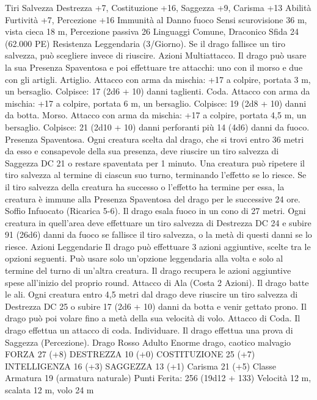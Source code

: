 \begin{multicols}{2}
Tiri Salvezza Destrezza +7, Costituzione +16, Saggezza +9,
Carisma +13
Abilità Furtività +7, Percezione +16
Immunità al Danno fuoco
Sensi scurovisione 36 m, vista cieca 18 m, Percezione passiva 26
Linguaggi Comune, Draconico
Sfida 24 (62.000 PE)
Resistenza Leggendaria (3/Giorno). Se il drago fallisce un tiro
salvezza, può scegliere invece di riuscire.
Azioni
Multiattacco. Il drago può usare la sua Presenza Spaventosa e
poi effettuare tre attacchi: uno con il morso e due con gli artigli.
Artiglio. Attacco con arma da mischia: +17 a colpire, portata 3
m, un bersaglio.
Colpisce: 17 (2d6 + 10) danni taglienti.
Coda. Attacco con arma da mischia: +17 a colpire, portata 6 m,
un bersaglio.
Colpisce: 19 (2d8 + 10) danni da botta.
Morso. Attacco con arma da mischia: +17 a colpire, portata 4,5
m, un bersaglio.
Colpisce: 21 (2d10 + 10) danni perforanti più 14 (4d6) danni da
fuoco.
Presenza Spaventosa. Ogni creatura scelta dal drago, che si trovi
entro 36 metri da esso e consapevole della sua presenza, deve
riuscire un tiro salvezza di Saggezza DC 21 o restare spaventata
per 1 minuto. Una creatura può ripetere il tiro salvezza al termine
di ciascun suo turno, terminando l’effetto se lo riesce. Se il tiro
salvezza della creatura ha successo o l’effetto ha termine per
essa, la creatura è immune alla Presenza Spaventosa del drago
per le successive 24 ore.
Soffio Infuocato (Ricarica 5-6). Il drago esala fuoco in un cono
di 27 metri. Ogni creatura in quell’area deve effettuare un tiro
salvezza di Destrezza DC 24 e subire 91 (26d6) danni da fuoco
se fallisce il tiro salvezza, o la metà di questi danni se lo riesce.
Azioni Leggendarie
Il drago può effettuare 3 azioni aggiuntive, scelte tra le opzioni
seguenti. Può usare solo un’opzione leggendaria alla volta e solo
al termine del turno di un’altra creatura. Il drago recupera le
azioni aggiuntive spese all’inizio del proprio round.
Attacco di Ala (Costa 2 Azioni). Il drago batte le ali. Ogni
creatura entro 4,5 metri dal drago deve riuscire un tiro salvezza
di Destrezza DC 25 o subire 17 (2d6 + 10) danni da botta e
venir gettato prono. Il drago può poi volare fino a metà della sua
velocità di volo.
Attacco di Coda. Il drago effettua un attacco di coda.
Individuare. Il drago effettua una prova di Saggezza
(Percezione).
Drago Rosso Adulto
Enorme drago, caotico malvagio
FORZA 27 (+8)
DESTREZZA 10 (+0)
COSTITUZIONE 25 (+7)
INTELLIGENZA 16 (+3)
SAGGEZZA 13 (+1)
Carisma 21 (+5)
Classe Armatura 19 (armatura naturale)
\hspace*{0pt}\hfill{Punti Ferita}: 256 (19d12 + 133)
Velocità 12 m, scalata 12 m, volo 24 m

\end{multicols}
